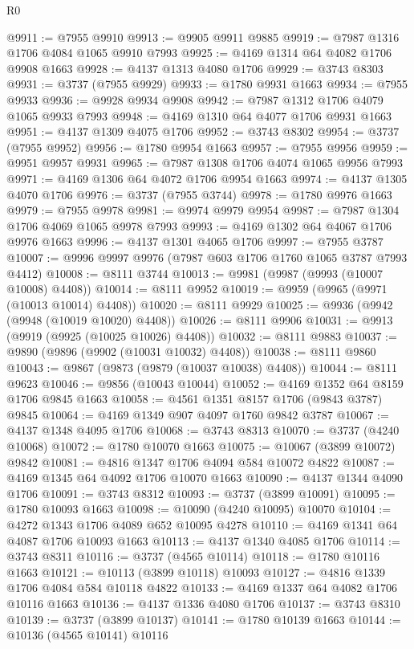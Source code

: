 \begin{lexlean}{R0}
\begin{coremodule}
@9911 := @7955 @9910
@9913 := @9905 @9911 @9885
@9919 := @7987 @1316 @1706 @4084 @1065 @9910 @7993
@9925 := @4169 @1314 @64 @4082 @1706 @9908 @1663
@9928 := @4137 @1313 @4080 @1706
@9929 := @3743 @8303
@9931 := @3737 (@7955 @9929)
@9933 := @1780 @9931 @1663
@9934 := @7955 @9933
@9936 := @9928 @9934 @9908
@9942 := @7987 @1312 @1706 @4079 @1065 @9933 @7993
@9948 := @4169 @1310 @64 @4077 @1706 @9931 @1663
@9951 := @4137 @1309 @4075 @1706
@9952 := @3743 @8302
@9954 := @3737 (@7955 @9952)
@9956 := @1780 @9954 @1663
@9957 := @7955 @9956
@9959 := @9951 @9957 @9931
@9965 := @7987 @1308 @1706 @4074 @1065 @9956 @7993
@9971 := @4169 @1306 @64 @4072 @1706 @9954 @1663
@9974 := @4137 @1305 @4070 @1706
@9976 := @3737 (@7955 @3744)
@9978 := @1780 @9976 @1663
@9979 := @7955 @9978
@9981 := @9974 @9979 @9954
@9987 := @7987 @1304 @1706 @4069 @1065 @9978 @7993
@9993 := @4169 @1302 @64 @4067 @1706 @9976 @1663
@9996 := @4137 @1301 @4065 @1706
@9997 := @7955 @3787
@10007 := @9996 @9997 @9976 (@7987 @603 @1706 @1760 @1065 @3787 @7993 @4412)
@10008 := @8111 @3744
@10013 := @9981 (@9987 (@9993 (@10007 @10008) @4408))
@10014 := @8111 @9952
@10019 := @9959 (@9965 (@9971 (@10013 @10014) @4408))
@10020 := @8111 @9929
@10025 := @9936 (@9942 (@9948 (@10019 @10020) @4408))
@10026 := @8111 @9906
@10031 := @9913 (@9919 (@9925 (@10025 @10026) @4408))
@10032 := @8111 @9883
@10037 := @9890 (@9896 (@9902 (@10031 @10032) @4408))
@10038 := @8111 @9860
@10043 := @9867 (@9873 (@9879 (@10037 @10038) @4408))
@10044 := @8111 @9623
@10046 := @9856 (@10043 @10044)
@10052 := @4169 @1352 @64 @8159 @1706 @9845 @1663
@10058 := @4561 @1351 @8157 @1706 (@9843 @3787) @9845
@10064 := @4169 @1349 @907 @4097 @1760 @9842 @3787
@10067 := @4137 @1348 @4095 @1706
@10068 := @3743 @8313
@10070 := @3737 (@4240 @10068)
@10072 := @1780 @10070 @1663
@10075 := @10067 (@3899 @10072) @9842
@10081 := @4816 @1347 @1706 @4094 @584 @10072 @4822
@10087 := @4169 @1345 @64 @4092 @1706 @10070 @1663
@10090 := @4137 @1344 @4090 @1706
@10091 := @3743 @8312
@10093 := @3737 (@3899 @10091)
@10095 := @1780 @10093 @1663
@10098 := @10090 (@4240 @10095) @10070
@10104 := @4272 @1343 @1706 @4089 @652 @10095 @4278
@10110 := @4169 @1341 @64 @4087 @1706 @10093 @1663
@10113 := @4137 @1340 @4085 @1706
@10114 := @3743 @8311
@10116 := @3737 (@4565 @10114)
@10118 := @1780 @10116 @1663
@10121 := @10113 (@3899 @10118) @10093
@10127 := @4816 @1339 @1706 @4084 @584 @10118 @4822
@10133 := @4169 @1337 @64 @4082 @1706 @10116 @1663
@10136 := @4137 @1336 @4080 @1706
@10137 := @3743 @8310
@10139 := @3737 (@3899 @10137)
@10141 := @1780 @10139 @1663
@10144 := @10136 (@4565 @10141) @10116

\end{coremodule}
\end{lexlean}
